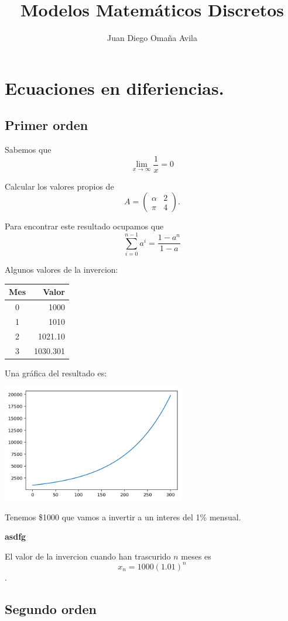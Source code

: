 \documentclass{article}
\title{Modelos Matemáticos Discretos}
\author{Juan Diego Omaña Avila}
\begin{document}
\maketitle
\section{Ecuaciones en diferiencias.}
\subsection{Primer orden}
Sabemos que $$\lim_{x\to\infty}\frac{1}{x}=0$$

Calcular los valores propios de $$A=
\begin{pmatrix}
\alpha & 2\\
\pi & 4
\end{pmatrix}.
$$

Para encontrar este resultado ocupamos que $$\sum_{i=0}^{n-1}a^i=\frac{1-a^{n}}{1-a}$$

Algunos valores de la invercion:
\begin{center}
\begin{tabular}{|c|r|}
\hline
Mes & Valor\\
\hline
0 & 1000 \\
1 & 1010 \\
2 & 1021.10 \\
3 & 1030.301 \\
\hline
\end{tabular}
\end{center}

Una gráfica del resultado es:

\begin{center}
\includegraphics[width=8cm]{GRAFICA}
\end{center}

Tenemos \$1000 que vamos a invertir a un interes del 1\% mensual.

\begin{center}
\huge
\textbf{asdfg}
\end{center}

El valor de la invercion cuando han trascurido $n$ meses es $$x_n=1000(1.01)^n$$.
\subsection{Segundo orden}
\end{document}
